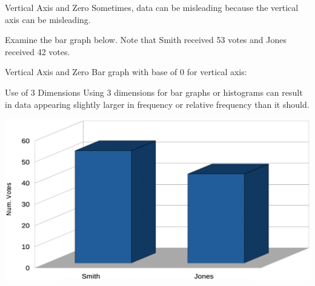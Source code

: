 \documentclass[t]{beamer}
\begin{document}
\begin{frame}{Vertical Axis and Zero}
Sometimes, data can be misleading because the vertical axis can be misleading. \newline\\	\pause

Examine the bar graph below. Note that Smith received 53 votes and Jones received 42 votes.
\begin{center}
\end{center}
\end{frame}

\begin{frame}{Vertical Axis and Zero}
Bar graph with base of 0 for vertical axis:
\begin{center}
\end{center}
\end{frame}

\begin{frame}{Use of 3 Dimensions}
Using 3 dimensions for bar graphs or histograms can result in data appearing slightly larger in frequency or relative frequency than it should.	\pause

\begin{center}
\includegraphics[scale=0.2]{../Images/3D_BarGraph.png}
\end{center}
\end{frame}
\end{document}
